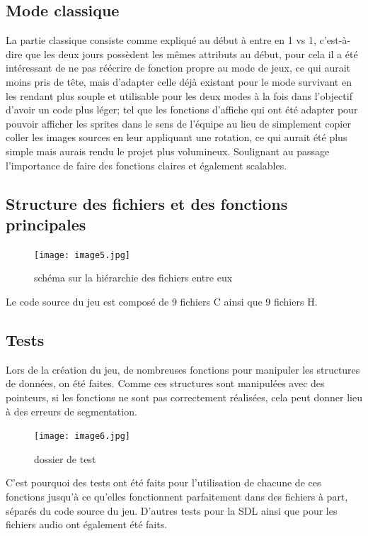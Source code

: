 \documentclass[a4paper,11pt]{article}
\begin{document}
\subsection{Mode classique}

La partie classique consiste comme expliqué au début à entre en 1 vs 1, c’est-à-dire que les deux jours possèdent les mêmes attributs au début, pour cela il a été intéressant de ne pas réécrire de fonction propre au mode de jeux, ce qui aurait moins pris de tête, mais d'adapter celle déjà existant pour le mode survivant en les rendant plus souple et utilisable pour les deux modes à la fois dans l'objectif d'avoir un code plus léger;  tel que les fonctions d'affiche qui ont été adapter pour pouvoir afficher les sprites dans le sens de l'équipe au lieu de simplement copier coller les images sources en leur appliquant une rotation, ce qui aurait été plus simple mais aurais rendu le projet plus volumineux. Soulignant au passage l'importance de faire des fonctions claires et également scalables.

\subsection{Structure des fichiers et des fonctions principales}
\begin{figure}[ht!]
\centering
\texttt{[image: image5.jpg]} 
\caption {\label{image8} schéma sur la hiérarchie des fichiers entre eux}
\end{figure}
 \smallbreak
Le code source du jeu est composé de 9 fichiers C ainsi que 9 fichiers H.

\subsection{Tests}
Lors de la création du jeu, de nombreuses fonctions pour manipuler les structures de données, on été faites. Comme ces structures sont manipulées avec des pointeurs, si les fonctions ne sont pas correctement réalisées, cela peut donner lieu à des erreurs de segmentation.
\begin{figure}[ht!]
\centering
\texttt{[image: image6.jpg]} 
\caption {\label{image9} dossier de test}
\end{figure}
 \smallbreak
C'est pourquoi des tests ont été faits pour l'utilisation de chacune de ces fonctions jusqu'à ce qu'elles fonctionnent parfaitement dans des fichiers à part, séparés du code source du jeu. D'autres tests pour la SDL ainsi que pour les fichiers audio ont également été faits.
\end{document}
